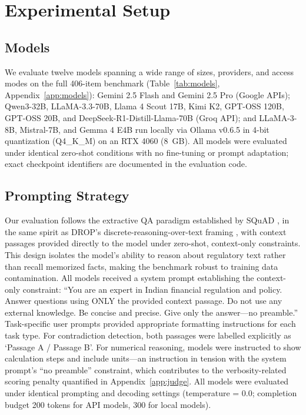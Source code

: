 \section{Experimental Setup}

\subsection{Models}

We evaluate twelve models spanning a wide range of sizes, providers, and access modes on the full 406-item benchmark (Table~\ref{tab:models}, Appendix~\ref{app:models}): Gemini 2.5 Flash and Gemini 2.5 Pro (Google APIs); Qwen3-32B, LLaMA-3.3-70B, Llama 4 Scout 17B, Kimi K2, GPT-OSS 120B, GPT-OSS 20B, and DeepSeek-R1-Distill-Llama-70B (Groq API); and LLaMA-3-8B, Mistral-7B, and Gemma 4 E4B run locally via Ollama v0.6.5 in 4-bit quantization (Q4\_K\_M) on an RTX 4060 (8~GB). All models were evaluated under identical zero-shot conditions with no fine-tuning or prompt adaptation; exact checkpoint identifiers are documented in the evaluation code.

\subsection{Prompting Strategy}

Our evaluation follows the extractive QA paradigm established by SQuAD \citep{rajpurkar2016squad}, in the same spirit as DROP's discrete-reasoning-over-text framing \citep{dua2019drop}, with context passages provided directly to the model under zero-shot, context-only constraints. This design isolates the model's ability to reason about regulatory text rather than recall memorized facts, making the benchmark robust to training data contamination. All models received a system prompt establishing the context-only constraint: ``You are an expert in Indian financial regulation and policy. Answer questions using ONLY the provided context passage. Do not use any external knowledge. Be concise and precise. Give only the answer---no preamble.'' Task-specific user prompts provided appropriate formatting instructions for each task type. For contradiction detection, both passages were labelled explicitly as `Passage A / Passage B'. For numerical reasoning, models were instructed to show calculation steps and include units---an instruction in tension with the system prompt's ``no preamble'' constraint, which contributes to the verbosity-related scoring penalty quantified in Appendix~\ref{app:judge}. All models were evaluated under identical prompting and decoding settings (temperature = 0.0; completion budget 200 tokens for API models, 300 for local models).


